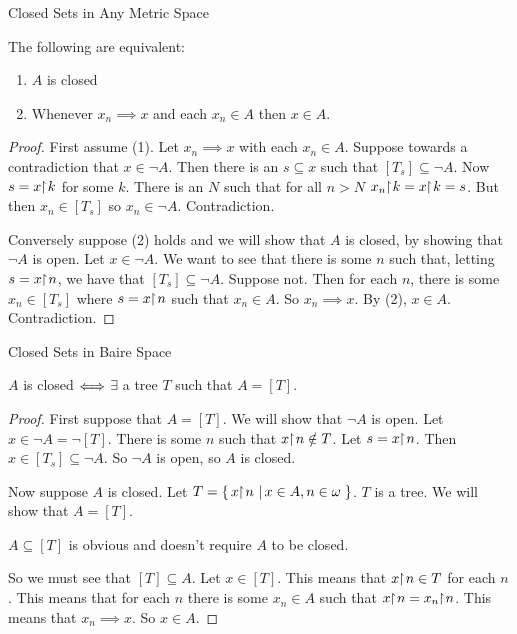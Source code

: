\documentclass[pdf,final]{prosper}
\newcommand{\skipsmall}{\vspace{1em}}
\begin{document}
\begin{slide}{Closed Sets in Any Metric Space}

\begin{lemma}
The following are equivalent:
\begin{enumerate}
  \item $A$ is closed
  \item Whenever $x_n\implies x$ and each $x_n\in A$ then $x\in A$.
\end{enumerate}
\end{lemma}
\begin{proof}
First assume (1).
Let $x_n\implies x$ with each $x_n\in A$. Suppose towards a
contradiction that $x\in\neg A$. Then there is an $s\subseteq x$ such that
$[T_s]\subseteq \neg A$. Now $s=x\!\!\upharpoonright\! k$ for some $k$. There is an $N$ such
that for
all $n>N$ $x_n\!\!\upharpoonright\! k = x\!\!\upharpoonright\! k = s$. But then $x_n\in [T_s]$  so $x_n\in
\neg A$. Contradiction.

\skipsmall

Conversely suppose (2) holds and we will show that $A$ is closed, by showing
that $\neg A$ is open. Let $x\in\neg A$. We want to see that there is some $n$
such that, letting $s=x\!\!\upharpoonright\! n$, we have that $[T_s]\subseteq \neg A$. Suppose
not. Then for each $n$, there is some $x_n\in[T_s]$ where $s=x\!\!\upharpoonright\! n$ such
that $x_n\in A$. So $x_n\implies x$. By (2), $x\in A$. Contradiction.
\end{proof}
\end{slide}

\begin{slide}{Closed Sets in Baire Space}
\begin{lemma}
$A$ is closed $\Longleftrightarrow$ $\exists$ a tree $T$ such that $A=[T]$.
\end{lemma}
\begin{proof}
First suppose that $A=[T]$. We will show that $\neg A$ is
open. Let $x\in \neg A=\neg[T]$. There is some $n$ such that
$x\!\!\upharpoonright\!
n\notin T$. Let $s=x\!\!\upharpoonright\! n$. Then $x\in[T_s]\subseteq\neg A$. So $\neg A$ is
open, so $A$ is closed. 

\skipsmall

Now suppose $A$ is closed. Let $T=\left\{ \, x\!\!\upharpoonright\! n \, \left| \, x\in A,
n\in\omega \, \right.\right\}$. $T$ is a tree. We will show that $A=[T]$. 

\skipsmall
$A\subseteq[T]$ is
obvious and doesn't require $A$ to be closed. 

\skipsmall

So we must see that $[T]\subseteq
A$. Let $x\in[T]$. This means that $x\!\!\upharpoonright\! n \in T$ for each $n$. This means
that for each $n$ there is some $x_n\in A$ such that $x\!\!\upharpoonright\! n = x_n \!\!\upharpoonright\! n$.
This means that $x_n\implies x$. So $x\in A$.
\end{proof}
\end{slide}
\end{document}
